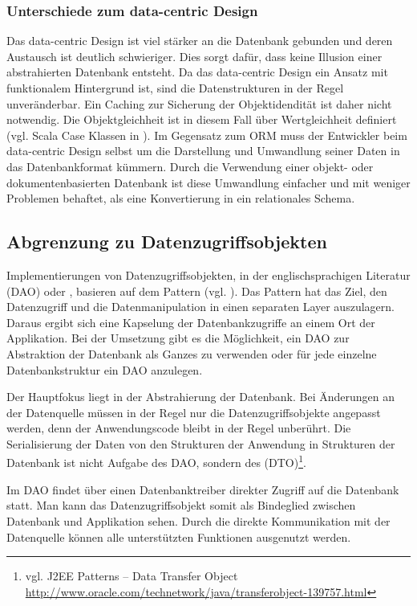 \subsubsection{Unterschiede zum data-centric Design}
Das data-centric Design ist viel stärker an die Datenbank gebunden und deren Austausch ist deutlich schwieriger. Dies sorgt dafür, dass keine Illusion einer abstrahierten Datenbank entsteht. Da das data-centric Design ein Ansatz mit funktionalem Hintergrund ist, sind die Datenstrukturen in der Regel unveränderbar. Ein Caching zur Sicherung der Objektidendität ist daher nicht notwendig. Die Objektgleichheit ist in diesem Fall über Wertgleichheit definiert (vgl. Scala Case Klassen in \cite{scala-case-class}). Im Gegensatz zum ORM muss der Entwickler beim data-centric Design selbst um die Darstellung und Umwandlung seiner Daten in das Datenbankformat kümmern. Durch die Verwendung einer objekt- oder dokumentenbasierten Datenbank ist diese Umwandlung einfacher und mit weniger Problemen behaftet, als eine Konvertierung in ein relationales Schema.

\subsection{Abgrenzung zu Datenzugriffsobjekten}
Implementierungen von Datenzugriffsobjekten, in der englischsprachigen Literatur  (DAO) oder , basieren auf dem  Pattern (vgl. \cite{j2ee-pattern}).  Das Pattern hat das Ziel, den Datenzugriff und die Datenmanipulation in einen separaten Layer auszulagern. Daraus ergibt sich eine Kapselung der Datenbankzugriffe an einem Ort der Applikation. Bei der Umsetzung gibt es die Möglichkeit, ein DAO zur Abstraktion der Datenbank als Ganzes zu verwenden oder für jede einzelne Datenbankstruktur ein DAO anzulegen.

Der Hauptfokus liegt in der Abstrahierung der Datenbank. Bei Änderungen an der Datenquelle müssen in der Regel nur die Datenzugriffsobjekte angepasst werden, denn der Anwendungscode bleibt in der Regel unberührt. Die Serialisierung der Daten von den Strukturen der Anwendung in Strukturen der Datenbank ist nicht Aufgabe des DAO, sondern des  (DTO)\footnote{vgl. J2EE Patterns – Data Transfer Object \url{http://www.oracle.com/technetwork/java/transferobject-139757.html}}.

Im DAO findet über einen Datenbanktreiber direkter Zugriff auf die Datenbank statt. Man kann das Datenzugriffsobjekt somit als Bindeglied zwischen Datenbank und Applikation sehen. Durch die direkte Kommunikation mit der Datenquelle können alle unterstützten Funktionen ausgenutzt werden. 

